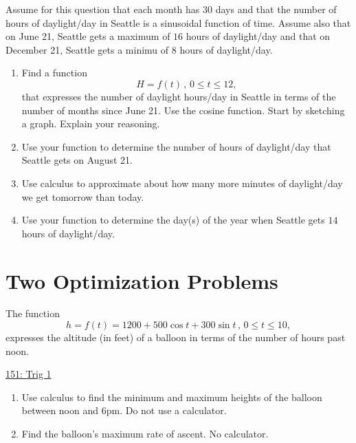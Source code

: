 \documentclass{ximera}
\begin{document}
\begin{question} \label{Q9DFERgefghL}
Assume for this question that each month has 30 days and that the number of hours of daylight/day in Seattle is a sinusoidal function of time. Assume also that on June 21, Seattle gets a maximum of $16$ hours of daylight/day and that on December 21, Seattle gets a minimu of $8$ hours of daylight/day.

\begin{enumerate}
\item Find a function 
\[
   H = f(t) \, , \, 0\leq t\leq 12,
\]
that expresses the number of daylight hours/day in Seattle in terms of the number of months since June 21. Use the cosine function. Start by sketching a graph. Explain your reasoning.

\item Use your function to determine the number of hours of daylight/day that Seattle gets on August 21.

\item Use calculus to approximate about how many more minutes of daylight/day we get tomorrow than today.

\item Use your function to determine the day(s) of the year when Seattle gets $14$ hours of daylight/day.

\end{enumerate}

\end{question}

\section{Two Optimization Problems}

\begin{question}  \label{Qdfethnnjjjuu}
The function
\[
    h = f(t) = 1200 + 500\cos t + 300\sin t \, , \, 0\leq t \leq 10 ,
\]
expresses the altitude (in feet) of a balloon in terms of the number of hours past noon.

\begin{onlineOnly}
    \begin{center}
\end{center}
\end{onlineOnly}

\href{https://www.desmos.com/calculator/f1ldi6yrek}{151: Trig 1}

\begin{enumerate}

\item Use calculus to find the minimum and maximum heights of the balloon between noon and 6pm. Do not use a calculator.

\item Find the balloon's maximum rate of ascent. No calculator.

\end{enumerate}

\end{question}
\end{document}
